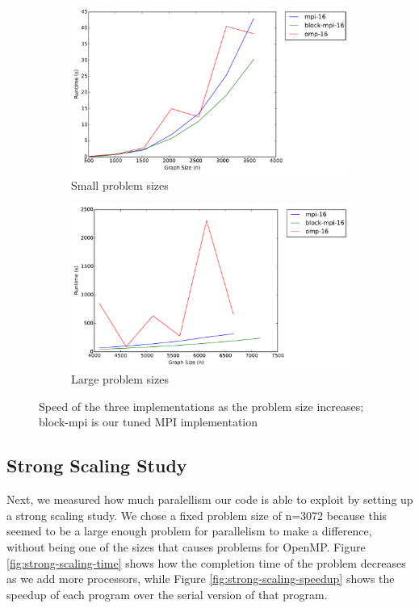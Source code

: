\documentclass[11pt]{article}
\begin{document}
\begin{figure}[ht]
	\centering
	\begin{subfigure}[b]{.45\textwidth}
		\includegraphics[width=\textwidth]{comparison_small.pdf}
		\caption{Small problem sizes}
	\end{subfigure}
	\begin{subfigure}[b]{.45\textwidth}
		\includegraphics[width=\textwidth]{comparison_large.pdf}
		\caption{Large problem sizes}
	\end{subfigure}
	\caption{Speed of the three implementations as the problem size increases; block-mpi is our tuned MPI implementation}
	\label{fig:size-comparison}
\end{figure}


\subsection{Strong Scaling Study}

Next, we measured how much paralellism our code is able to exploit by setting up a strong scaling study.
We chose a fixed problem size of n=3072 because this seemed to be a large enough problem for parallelism to make a difference, without being one of the sizes that causes problems for OpenMP.
Figure \ref{fig:strong-scaling-time} shows how the completion time of the problem decreases as we add more processors, while Figure \ref{fig:strong-scaling-speedup} shows the speedup of each program over the serial version of that program.
\end{document}

